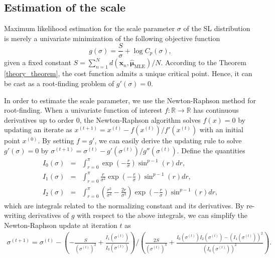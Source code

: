 \documentclass[10pt]{article}
\newcommand{\bfx}{\mathbf{x}}
\newcommand{\bfmu}{\boldsymbol{\mu}}
\newcommand{\bbR}{\mathbb{R}}
\newcommand{\mleloc}{\hat{\bfmu}_{\textrm{MLE}}}
\begin{document}
\subsection{Estimation of the scale}

Maximum likelihood estimation for the scale parameter $\sigma$ of the SL distribution is merely a univariate minimization of the following objective function
\begin{equation*}
g(\sigma) = \frac{S}{\sigma} + \log C_p (\sigma),
\end{equation*} 
given a fixed constant $S = \sum_{n=1}^N d (\bfx_n, \mleloc) / N$. According to the Theorem \ref{theory_theorem}, the cost function admits a unique critical point. Hence, it can be cast as a root-finding problem of $g'(\sigma) = 0$. 

In order to estimate the scale parameter, we use the Newton-Raphson method \cite{ypma_1995_HistoricalDevelopmentNewton, burden_2016_NumericalAnalysis} for root-finding. When a univariate  function of interest $f:\bbR \rightarrow \bbR$ has continuous derivatives up to order 0, the Newton-Raphson algorithm solves $f(x) = 0$ by updating an iterate as $x^{(t+1)} = x^{{(t)}} - {f(x^{(t)})}/{f'(x^{(t)})}$ with an initial point $x^{(0)}$. By setting $f = g'$, we can easily derive the updating rule to solve $g'(\sigma) = 0$ by  $\sigma^{(t+1)} = \sigma^{(t)} - {g'(\sigma^{(t)})}/{g''(\sigma^{(t)})}$. Define the quantities
\begin{eqnarray*}
	I_0 (\sigma) &=& \int_{r=0}^\pi \exp \left( -\frac{r}{\sigma}\right) \sin^{p-1}(r)dr, \\
	I_1 (\sigma) &=& \int_{r=0}^\pi \frac{r}{\sigma^2} \exp \left( -\frac{r}{\sigma}\right) \sin^{p-1}(r)dr, \\
	I_2 (\sigma) &=& \int_{r=0}^\pi \left(\frac{r^2}{\sigma^4} - \frac{2r}{\sigma^3}\right) \exp \left( -\frac{r}{\sigma}\right) \sin^{p-1}(r)dr,
\end{eqnarray*}
which are integrals related to the normalizing constant and its derivatives. By re-writing derivatives of $g$ with respect to the above integrals, we can simplify the Newton-Raphson update at iteration $t$ as
\begin{eqnarray}
\sigma^{(t+1)} = \sigma^{(t)} - 
\left(
-\frac{S}{(\sigma^{(t)})^2} + \frac{I_1 (\sigma^{(t)})}{I_0 (\sigma^{(t)})} 
\right) \Bigg/ \left(
\frac{2S}{(\sigma^{(t)})^3} + \frac{I_0 (\sigma^{(t)}) I_2 (\sigma^{(t)}) - (I_1 (\sigma^{(t)}))^2}{(I_0 (\sigma^{(t)}))^2}
\right).\label{eq:update_scale_newton_exact}
\end{eqnarray}
\end{document}
